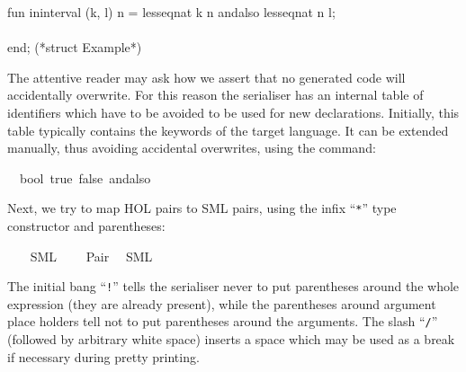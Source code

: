 \begin{isabellebody}
\begin{isamarkuptext}
\hspace*{0pt}fun in{}interval (k, l) n = less{}eq{}nat k n andalso less{}eq{}nat n l;\\
\hspace*{0pt}\\
\hspace*{0pt}end; (*struct Example*)%
\end{isamarkuptext}%
\isamarkuptrue%
%
\endisatagquote
{\isafoldquote}%
%
\isadelimquote
%
\endisadelimquote
%
\begin{isamarkuptext}%
\noindent The attentive reader may ask how we assert that no generated
  code will accidentally overwrite.  For this reason the serialiser has
  an internal table of identifiers which have to be avoided to be used
  for new declarations.  Initially, this table typically contains the
  keywords of the target language.  It can be extended manually, thus avoiding
  accidental overwrites, using the \hyperlink{command.code-reserved}{\mbox{}} command:%
\end{isamarkuptext}%
\isamarkuptrue%
%
\isadelimquote
%
\endisadelimquote
%
\isatagquote
{}\isamarkupfalse%
\ {\isachardoublequoteopen}{\isasymSML}{\isachardoublequoteclose}\ bool\ true\ false\ andalso%
\endisatagquote
{\isafoldquote}%
%
\isadelimquote
%
\endisadelimquote
%
\begin{isamarkuptext}%
\noindent Next, we try to map HOL pairs to SML pairs, using the
  infix ``\verb|*|'' type constructor and parentheses:%
\end{isamarkuptext}%
\isamarkuptrue%
%
\isadeliminvisible
%
\endisadeliminvisible
%
\isataginvisible
%
\endisataginvisible
{\isafoldinvisible}%
%
\isadeliminvisible
%
\endisadeliminvisible
%
\isadelimquotett
%
\endisadelimquotett
%
\isatagquotett
{}\isamarkupfalse%
\ {\isacharasterisk}\isanewline
\ \ {\isacharparenleft}SML\ \ {}\ {\isachardoublequoteopen}{\isacharasterisk}{\isachardoublequoteclose}{\isacharparenright}\isanewline
{}\isamarkupfalse%
\ Pair\isanewline
\ \ {\isacharparenleft}SML\ {\isachardoublequoteopen}{\isacharbang}{\isacharparenleft}{\isacharparenleft}{\isacharunderscore}{\isacharparenright}{\isacharcomma}{\isacharslash}\ {\isacharparenleft}{\isacharunderscore}{\isacharparenright}{\isacharparenright}{\isachardoublequoteclose}{\isacharparenright}%
\endisatagquotett
{\isafoldquotett}%
%
\isadelimquotett
%
\endisadelimquotett
%
\begin{isamarkuptext}%
\noindent The initial bang ``\verb|!|'' tells the serialiser
  never to put
  parentheses around the whole expression (they are already present),
  while the parentheses around argument place holders
  tell not to put parentheses around the arguments.
  The slash ``\verb|/|'' (followed by arbitrary white space)
  inserts a space which may be used as a break if necessary
  during pretty printing.


\end{isamarkuptext}
\end{isabellebody}
